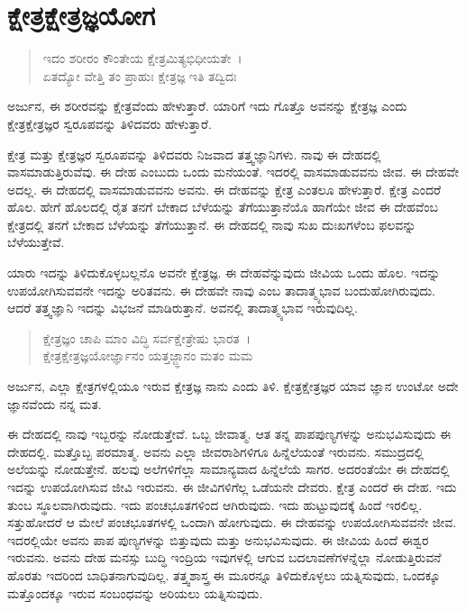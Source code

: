 
\chapter{ಕ್ಷೇತ್ರಕ್ಷೇತ್ರಜ್ಞಯೋಗ}

\begin{verse}
ಇದಂ ಶರೀರಂ ಕೌಂತೇಯ ಕ್ಷೇತ್ರಮಿತ್ಯಭಿಧೀಯತೇ~।\\ಏತದ್ಯೋ ವೇತ್ತಿ ತಂ ಪ್ರಾಹುಃ ಕ್ಷೇತ್ರಜ್ಞ ಇತಿ ತದ್ವಿದಃ 
\end{verse}

{\small ಅರ್ಜುನ, ಈ ಶರೀರವನ್ನು ಕ್ಷೇತ್ರವೆಂದು ಹೇಳುತ್ತಾರೆ. ಯಾರಿಗೆ ಇದು ಗೊತ್ತೊ ಅವನನ್ನು ಕ್ಷೇತ್ರಜ್ಞ ಎಂದು ಕ್ಷೇತ್ರಕ್ಷೇತ್ರಜ್ಞರ ಸ್ವರೂಪವನ್ನು ತಿಳಿದವರು ಹೇಳುತ್ತಾರೆ.}

ಕ್ಷೇತ್ರ ಮತ್ತು ಕ್ಷೇತ್ರಜ್ಞರ ಸ್ವರೂಪವನ್ನು ತಿಳಿದವರು ನಿಜವಾದ ತತ್ತ್ವಜ್ಞಾನಿಗಳು. ನಾವು ಈ ದೇಹದಲ್ಲಿ ವಾಸಮಾಡುತ್ತಿರುವೆವು. ಈ ದೇಹ ಎಂಬುದು ಒಂದು ಮನೆಯಂತೆ. ಇದರಲ್ಲಿ ವಾಸಮಾಡುವವನು ಜೀವ. ಈ ದೇಹವೇ ಅದಲ್ಲ. ಈ ದೇಹದಲ್ಲಿ ವಾಸಮಾಡುವವನು ಅವನು. ಈ ದೇಹವನ್ನು ಕ್ಷೇತ್ರ ಎಂತಲೂ ಹೇಳುತ್ತಾರೆ. ಕ್ಷೇತ್ರ ಎಂದರೆ ಹೊಲ. ಹೇಗೆ ಹೊಲದಲ್ಲಿ ರೈತ ತನಗೆ ಬೇಕಾದ ಬೆಳೆಯನ್ನು ತೆಗೆಯುತ್ತಾನೆಯೊ ಹಾಗೆಯೇ ಜೀವ ಈ ದೇಹವೆಂಬ ಕ್ಷೇತ್ರದಲ್ಲಿ ತನಗೆ ಬೇಕಾದ ಬೆಳೆಯನ್ನು ತೆಗೆಯುತ್ತಾನೆ. ಈ ದೇಹದಲ್ಲಿ ನಾವು ಸುಖ ದುಃಖಗಳೆಂಬ ಫಲವನ್ನು ಬೆಳೆಯುತ್ತೇವೆ.

ಯಾರು ಇದನ್ನು ತಿಳಿದುಕೊಳ್ಳಬಲ್ಲನೊ ಅವನೇ ಕ್ಷೇತ್ರಜ್ಞ. ಈ ದೇಹವೆನ್ನುವುದು ಜೀವಿಯ ಒಂದು ಹೊಲ. ಇದನ್ನು ಉಪಯೋಗಿಸುವವನೇ ಇದನ್ನು ಅರಿತವನು. ಈ ದೇಹವೇ ನಾವು ಎಂಬ ತಾದಾತ್ಮ್ಯಭಾವ ಬಂದುಹೋಗಿರುವುದು. ಆದರೆ ತತ್ತ್ವಜ್ಞಾನಿ ಇದನ್ನು ವಿಭಜನೆ ಮಾಡಿರುತ್ತಾನೆ. ಅವನಲ್ಲಿ ತಾದಾತ್ಮ್ಯಭಾವ ಇರುವುದಿಲ್ಲ.

\begin{verse}
ಕ್ಷೇತ್ರಜ್ಞಂ ಚಾಪಿ ಮಾಂ ವಿದ್ಧಿ ಸರ್ವಕ್ಷೇತ್ರೇಷು ಭಾರತ~।\\ಕ್ಷೇತ್ರಕ್ಷೇತ್ರಜ್ಞಯೋರ್ಜ್ಞಾನಂ ಯತ್ತಜ್ಜ್ಞಾನಂ ಮತಂ ಮಮ 
\end{verse}

{\small ಅರ್ಜುನ, ಎಲ್ಲಾ ಕ್ಷೇತ್ರಗಳಲ್ಲಿಯೂ ಇರುವ ಕ್ಷೇತ್ರಜ್ಞ ನಾನು ಎಂದು ತಿಳಿ. ಕ್ಷೇತ್ರಕ್ಷೇತ್ರಜ್ಞರ ಯಾವ ಜ್ಞಾನ ಉಂಟೋ ಅದೇ ಜ್ಞಾನವೆಂದು ನನ್ನ ಮತ.}

ಈ ದೇಹದಲ್ಲಿ ನಾವು ಇಬ್ಬರನ್ನು ನೋಡುತ್ತೇವೆ. ಒಬ್ಬ ಜೀವಾತ್ಮ. ಆತ ತನ್ನ ಪಾಪಪುಣ್ಯಗಳನ್ನು ಅನುಭವಿಸುವುದು ಈ ದೇಹದಲ್ಲಿ. ಮತ್ತೊಬ್ಬ ಪರಮಾತ್ಮ. ಅವನು ಎಲ್ಲಾ ಜೀವರಾಶಿಗಳಿಗೂ ಹಿನ್ನೆಲೆಯಂತೆ ಇರುವನು. ಸಮುದ್ರದಲ್ಲಿ ಅಲೆಯನ್ನು ನೋಡುತ್ತೇನೆ. ಹಲವು ಅಲೆಗಳಿಗೆಲ್ಲಾ ಸಾಮಾನ್ಯವಾದ ಹಿನ್ನೆಲೆಯೆ ಸಾಗರ. ಅದರಂತೆಯೇ ಈ ದೇಹದಲ್ಲಿ ಇದನ್ನು ಉಪಯೋಗಿಸುವ ಜೀವಿ ಇರುವನು. ಈ ಜೀವಿಗಳಿಗೆಲ್ಲ ಒಡೆಯನೇ ದೇವರು. ಕ್ಷೇತ್ರ ಎಂದರೆ ಈ ದೇಹ. ಇದು ತುಂಬ ಸ್ಥೂಲವಾಗಿರುವುದು. ಇದು ಪಂಚಭೂತಗಳಿಂದ ಆಗಿರುವುದು. ಇದು ಹುಟ್ಟುವುದಕ್ಕೆ ಹಿಂದೆ ಇರಲಿಲ್ಲ. ಸತ್ತುಹೋದರೆ ಆ ಮೇಲೆ ಪಂಚಭೂತಗಳಲ್ಲಿ ಒಂದಾಗಿ ಹೋಗುವುದು. ಈ ದೇಹವನ್ನು ಉಪಯೋಗಿಸುವವನೇ ಜೀವ. ಇದರಲ್ಲಿಯೇ ಅವನು ಪಾಪ ಪುಣ್ಯಗಳನ್ನು ಬಿತ್ತುವುದು ಮತ್ತು ಅನುಭವಿಸುವುದು. ಈ ಜೀವಿಯ ಹಿಂದೆ ಈಶ್ವರ ಇರುವನು. ಅವನು ದೇಹ ಮನಸ್ಸು ಬುದ್ಧಿ ಇಂದ್ರಿಯ ಇವುಗಳಲ್ಲಿ ಆಗುವ ಬದಲಾವಣೆಗಳನ್ನೆಲ್ಲಾ ನೋಡುತ್ತಿರುವನೆ ಹೊರತು ಇದರಿಂದ ಬಾಧಿತನಾಗುವುದಿಲ್ಲ. ತತ್ತ್ವಶಾಸ್ತ್ರ ಈ ಮೂರನ್ನೂ ತಿಳಿದುಕೊಳ್ಳಲು ಯತ್ನಿಸುವುದು, ಒಂದಕ್ಕೂ ಮತ್ತೊಂದಕ್ಕೂ ಇರುವ ಸಂಬಂಧವನ್ನು ಅರಿಯಲು ಯತ್ನಿಸುವುದು.

